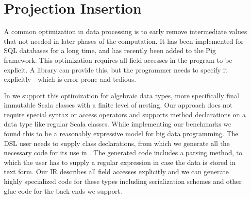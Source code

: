 \section{Projection Insertion}
\label{sec:field-reduction}

A common optimization in data processing is to early remove intermediate values that not needed in later phases of the computation. It has been implemented for SQL databases for a long time, and has recently been added to the Pig framework. This optimization requires all field accesses in the program to be explicit. A library can provide this, but the programmer needs to specify it explicitly - which is error prone and tedious. 


In \tool we support this optimization for algebraic data types, more specifically final immutable Scala classes with a finite level of nesting. Our approach does not require special syntax or access operators and supports method declarations on a data type like  regular Scala classes. While implementing our benchmarks we found this to be a reasonably expressive model for big data programming. The DSL user needs to supply class declarations, from which we generate all the necessary code for its use in \tool. The generated code includes a parsing method, to which the user has to supply a regular expression in case the data is stored in text form. Our IR describes all field accesses explicitly and we can generate highly specialized code for these types including serialization schemes and other glue code for the back-ends we support.

